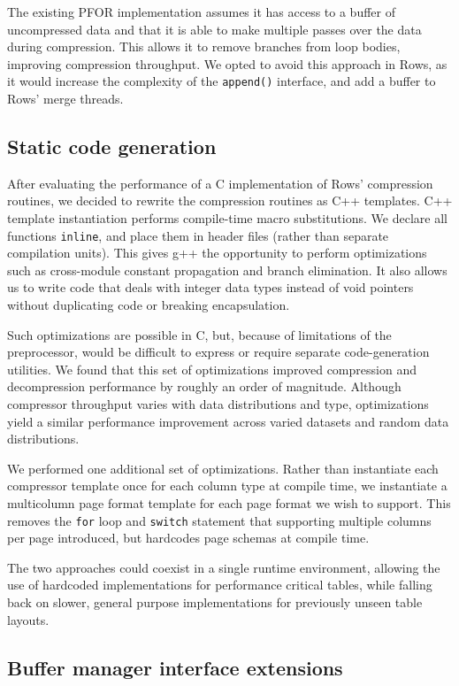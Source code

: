 \documentclass{sig-alternate-sigmod08}
\newcommand{\rows}{Rows\xspace}
\newcommand{\rowss}{Rows'\xspace}
\begin{document}
The existing PFOR implementation assumes it has access to
a buffer of uncompressed data and that it is able to make multiple
passes over the data during compression.  This allows it to remove
branches from loop bodies, improving compression throughput.  We opted
to avoid this approach in \rows, as it would increase the complexity
of the {\tt append()} interface, and add a buffer to \rowss merge threads.

\subsection{Static code generation}

After evaluating the performance of a C implementation of \rowss
compression routines, we decided to rewrite the compression routines
as C++ templates.  C++ template instantiation performs compile-time
macro substitutions.  We declare all functions {\tt inline}, and place
them in header files (rather than separate compilation units).  This
gives g++ the opportunity to perform optimizations such as
cross-module constant propagation and branch elimination.  It also
allows us to write code that deals with integer data types instead of
void pointers without duplicating code or breaking encapsulation.

Such optimizations are possible in C, but, because of limitations of
the preprocessor, would be difficult to express or require separate
code-generation utilities.  We found that this set of optimizations
improved compression and decompression performance by roughly an order
of magnitude.  Although compressor throughput varies with data distributions
and type, optimizations yield a similar performance improvement across
varied datasets and random data distributions.

We performed one additional set of optimizations.  Rather than
instantiate each compressor template once for each column type at
compile time, we instantiate a multicolumn page format template for
each page format we wish to support.  This removes the {\tt for} loop
and {\tt switch} statement that supporting multiple columns per page
introduced, but hardcodes page schemas at compile time.

The two approaches could coexist in a single runtime environment,
allowing the use of hardcoded implementations for performance critical
tables, while falling back on slower, general purpose implementations
for previously unseen table layouts.

\subsection{Buffer manager interface extensions}
\end{document}
